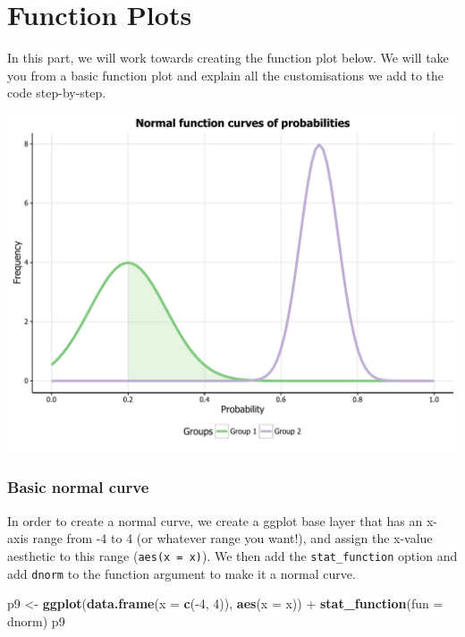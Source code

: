 \documentclass[]{article}
\newenvironment{Shaded}{\begin{snugshade}}{\end{snugshade}}
\newcommand{\KeywordTok}[1]{\textcolor[rgb]{0.13,0.29,0.53}{\textbf{{#1}}}}
\newcommand{\DataTypeTok}[1]{\textcolor[rgb]{0.13,0.29,0.53}{{#1}}}
\newcommand{\DecValTok}[1]{\textcolor[rgb]{0.00,0.00,0.81}{{#1}}}
\newcommand{\StringTok}[1]{\textcolor[rgb]{0.31,0.60,0.02}{{#1}}}
\newcommand{\NormalTok}[1]{{#1}}
\begin{document}
\section{Function Plots}\label{function-plots}

In this part, we will work towards creating the function plot below. We
will take you from a basic function plot and explain all the
customisations we add to the code step-by-step.

\begin{center}\includegraphics{0_all_posts_pdf/function_final-1} \end{center}

\subsubsection{Basic normal curve}\label{basic-normal-curve}

In order to create a normal curve, we create a ggplot base layer that
has an x-axis range from -4 to 4 (or whatever range you want!), and
assign the x-value aesthetic to this range (\texttt{aes(x\ =\ x)}). We
then add the \texttt{stat\_function} option and add \texttt{dnorm} to
the function argument to make it a normal curve.

\begin{Shaded}
\begin{Highlighting}[]
\NormalTok{p9 <-}\StringTok{ }\KeywordTok{ggplot}\NormalTok{(}\KeywordTok{data.frame}\NormalTok{(}\DataTypeTok{x =} \KeywordTok{c}\NormalTok{(-}\DecValTok{4}\NormalTok{, }\DecValTok{4}\NormalTok{)), }\KeywordTok{aes}\NormalTok{(}\DataTypeTok{x =} \NormalTok{x)) +}
\StringTok{      }\KeywordTok{stat_function}\NormalTok{(}\DataTypeTok{fun =} \NormalTok{dnorm)}
\NormalTok{p9}
\end{Highlighting}
\end{Shaded}
\end{document}
